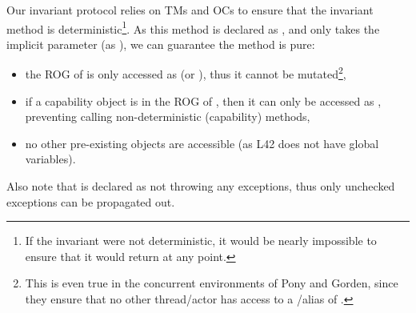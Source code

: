 
Our invariant protocol relies on TMs and OCs to ensure that the invariant method is deterministic\footnote{If the invariant were not deterministic, it would be nearly impossible to ensure that it would return \Q@true@ at any point.}.
As this method is declared as \Q@read@, and only takes the implicit parameter \Q@this@ (as \Q@read@), we can guarantee the method is pure:
\begin{itemize}
\item the ROG of \Q@this@ is only accessed as \Q@read@ (or \Q@imm@), thus it cannot be mutated\footnote{This is even true in the concurrent environments of Pony and Gorden, since they ensure that no other thread/actor has access to a \Q@mut@/\Q@capsule@ alias of \Q@this@.},
\item if a capability object is in the ROG of \Q@this@, then it can only be accessed as \Q@read@, preventing calling non-deterministic (capability) methods,
\item no other pre-existing objects are accessible (as L42 does not have global variables).
\end{itemize}

\noindent Also note that \Q@invariant@ is declared as not throwing any exceptions,
	thus only unchecked exceptions can be propagated out.


